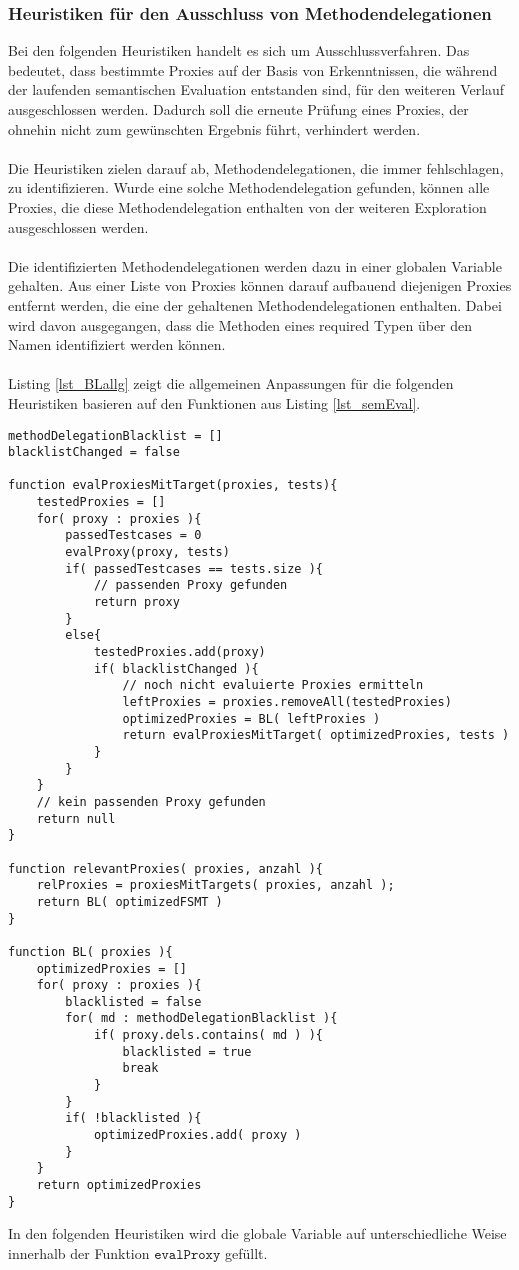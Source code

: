 \documentclass[a4paper,12pt]{article}
\begin{document}
\subsubsection{Heuristiken für den Ausschluss von Methodendelegationen}
Bei den folgenden Heuristiken handelt es sich um Ausschlussverfahren. Das bedeutet, dass bestimmte Proxies auf der Basis von Erkenntnissen, die während der laufenden semantischen Evaluation entstanden sind, für den weiteren Verlauf ausgeschlossen werden. Dadurch soll die erneute Prüfung eines Proxies, der ohnehin nicht zum gewünschten Ergebnis führt, verhindert werden.
\\\\
Die Heuristiken zielen darauf ab, Methodendelegationen, die immer fehlschlagen, zu identifizieren. Wurde eine solche Methodendelegation gefunden, können alle Proxies, die diese Methodendelegation enthalten von der weiteren Exploration ausgeschlossen werden.
\\\\
Die identifizierten Methodendelegationen werden dazu in einer globalen Variable gehalten. Aus einer Liste von Proxies können darauf aufbauend diejenigen Proxies entfernt werden, die eine der gehaltenen Methodendelegationen enthalten. Dabei wird davon ausgegangen, dass die Methoden eines required Typen über den Namen identifiziert werden können.
\\\\
Listing \ref{lst_BLallg} zeigt die allgemeinen Anpassungen für die folgenden Heuristiken basieren auf den Funktionen aus Listing \ref{lst_semEval}.
\begin{lstlisting}[style = pseudo, label = lst_BLallg]
methodDelegationBlacklist = []
blacklistChanged = false

function evalProxiesMitTarget(proxies, tests){
	testedProxies = []
	for( proxy : proxies ){
		passedTestcases = 0
		evalProxy(proxy, tests)
		if( passedTestcases == tests.size ){
			// passenden Proxy gefunden
			return proxy
		}
		else{
			testedProxies.add(proxy)
			if( blacklistChanged ){
				// noch nicht evaluierte Proxies ermitteln
				leftProxies = proxies.removeAll(testedProxies)
				optimizedProxies = BL( leftProxies )	
				return evalProxiesMitTarget( optimizedProxies, tests )
			}
		}
	}
	// kein passenden Proxy gefunden
	return null
}

function relevantProxies( proxies, anzahl ){
	relProxies = proxiesMitTargets( proxies, anzahl );
	return BL( optimizedFSMT )
}  

function BL( proxies ){
	optimizedProxies = []	
	for( proxy : proxies ){
		blacklisted = false
		for( md : methodDelegationBlacklist ){
			if( proxy.dels.contains( md ) ){
				blacklisted = true
				break
			}	
		}
		if( !blacklisted ){
			optimizedProxies.add( proxy )
		}
	}
	return optimizedProxies
}

\end{lstlisting}
\noindent
In den folgenden Heuristiken wird die globale Variable auf unterschiedliche Weise innerhalb der Funktion $\texttt{evalProxy}$ gefüllt.
\end{document}

